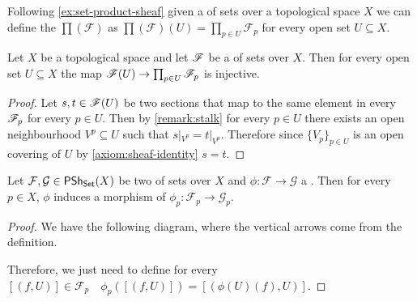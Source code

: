 \documentclass[../main.tex]{subfiles}
\begin{document}
\begin{example}
  Following \autoref{ex:set-product-sheaf} given a  of sets over a topological space \(X\) we can define the  \(\prod(\mathcal{F})\) as \(\prod(\mathcal{F})(U) = \prod_{p \in U} \mathcal{F}_{p}\) for every open set \(U \subseteq X\).
\end{example}


\begin{proposition} \label{prop:map-to-prod-stalks-injective}
  Let \(X\) be a topological space and let \(\mathscr{F}\) be a  of sets over \(X\). Then for every open set \(U \subseteq X\) the map \(\mathscr{F}(U) \to \prod_{p \in U} \mathscr{F}_{p}\) is injective.
\end{proposition}
\begin{proof}
  Let \(s, t \in \mathscr{F}(U)\) be two sections that map to the same element in every  \(\mathscr{F}_{p}\) for every \(p \in U\).
  Then by \autoref{remark:stalk} for every \(p \in U\) there exists an open neighbourhood \(V^{p} \subseteq U\) such that \(s|_{V^{p}} = t|_{V^{p}}\).
  Therefore since \(\{V_{p}\}_{p \in U}\) is an open covering of \(U\) by \ref{axiom:sheaf-identity} \(s = t\).
\end{proof}

\begin{proposition} \label{prop:induced-stalk-morphism}
  Let \(\mathcal{F}, \mathcal{G} \in \mathsf{PSh}_{\mathsf{Set}}(X)\) be two  of sets over \(X\) and \(\phi: \mathcal{F} \to \mathcal{G}\) a .
  Then for every \(p \in X\), \(\phi\) induces a morphism of  \(\phi_{p}: \mathcal{F}_{p} \to \mathcal{G}_{p}\).
\end{proposition}
\begin{proof}
  We have the following diagram, where the vertical arrows come from the  definition.

  \begin{center}
  \end{center}
  Therefore, we just need to define for every \([(f, U)] \in \mathcal{F}_{p} \quad \phi_{p}([(f, U)]) = [(\phi(U)(f), U)]\).
\end{proof}
\end{document}
